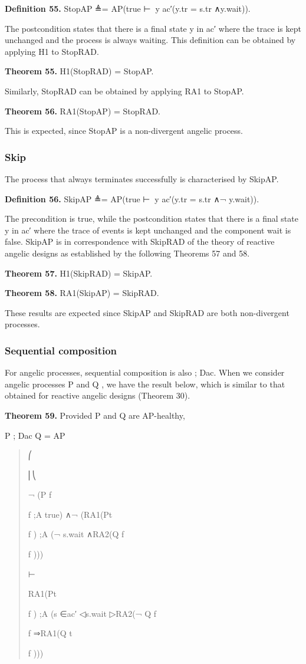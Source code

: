 \documentclass[11pt]{article}
\begin{document}
\noindent\textbf{Definition 55.} StopAP ≜= AP(true ⊢∈⃝y ac′(y.tr = s.tr ∧y.wait)).


The postcondition states that there is a final state y in ac′ where the trace is kept unchanged and the process is always waiting. This definition can be obtained by applying H1 to StopRAD.

\noindent\textbf{Theorem 55.} H1(StopRAD) = StopAP.


Similarly, StopRAD can be obtained by applying RA1 to StopAP.

\noindent\textbf{Theorem 56.} RA1(StopAP) = StopRAD.


This is expected, since StopAP is a non-divergent angelic process.

\subsubsection{Skip}
The process that always terminates successfully is characterised by SkipAP.

\noindent\textbf{Definition 56.} SkipAP ≜= AP(true ⊢∈⃝y ac′(y.tr = s.tr ∧¬ y.wait)).


The precondition is true, while the postcondition states that there is a final state y in ac′ where the trace of events is kept unchanged and the component wait is false. SkipAP is in correspondence with SkipRAD of the theory of reactive angelic designs as established by the following Theorems 57 and 58.

\noindent\textbf{Theorem 57.} H1(SkipRAD) = SkipAP.


\noindent\textbf{Theorem 58.} RA1(SkipAP) = SkipRAD.


These results are expected since SkipAP and SkipRAD are both non-divergent processes.

\subsubsection{Sequential composition}
For angelic processes, sequential composition is also ; Dac. When we consider angelic processes P and Q , we have the result below, which is similar to that obtained for reactive angelic designs (Theorem 30).

\noindent\textbf{Theorem 59.} Provided P and Q are AP-healthy,


P ; Dac Q = AP

\begin{quote}\small\raggedright
⎛
\par
⎜⎝
\par
¬ (P f
\par
f ;A true) ∧¬ (RA1(Pt
\par
f ) ;A (¬ s.wait ∧RA2(Q f
\par
f )))
\par
⊢
\par
RA1(Pt
\par
f ) ;A (s ∈ac′ ◁s.wait ▷RA2(¬ Q f
\par
f ⇒RA1(Q t
\par
f )))
\end{quote}
\end{document}
